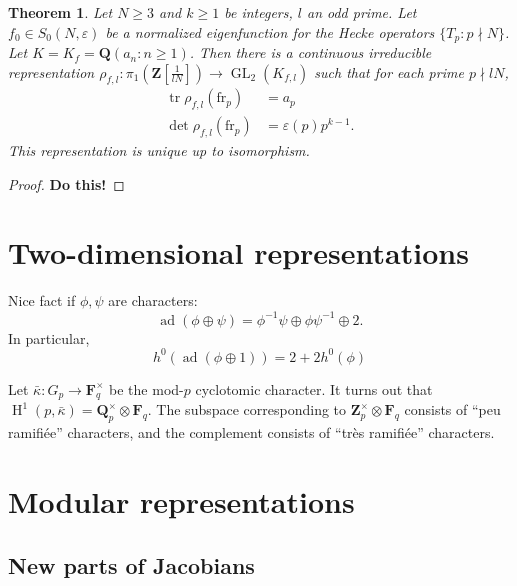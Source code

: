 \documentclass{article}
\DeclareMathOperator{\adjoint}{ad}
\DeclareMathOperator{\GL}{GL}
\DeclareMathOperator{\h}{H}
\DeclareMathOperator{\trace}{tr}
\newcommand{\dF}{\mathbf{F}}
\newcommand{\dQ}{\mathbf{Q}}
\newcommand{\dZ}{\mathbf{Z}}
\newcommand{\arithfrob}{\mathrm{fr}}
\newtheorem{theorem}[subsection]{Theorem}
\begin{document}
\begin{theorem}
Let $N\geqslant 3$ and $k\geqslant 1$ be integers, $l$ an odd prime. Let 
$f_0\in S_0(N,\varepsilon)$ be a normalized eigenfunction for the Hecke 
operators $\{T_p:p\nmid N\}$. Let $K=K_f=\dQ(a_n:n\geqslant 1)$. 
Then there is a continuous irreducible representation 
$\rho_{f,l}:\pi_1\left(\dZ[\frac{1}{l N}]\right)\to \GL_2(K_{f,l})$ such that 
for each prime $p\nmid l N$, 
\begin{align*}
  \trace \rho_{f,l}(\arithfrob_p) &= a_p \\
  \det \rho_{f,l}(\arithfrob_p) &= \varepsilon(p) p^{k-1} .
\end{align*}
This representation is unique up to isomorphism. 
\end{theorem}
\begin{proof}
\textbf{Do this!}
\end{proof}





\section{Two-dimensional representations}

Nice fact if $\phi,\psi$ are characters: 
\[
  \adjoint(\phi\oplus \psi) = \phi^{-1}\psi\oplus \phi\psi^{-1}\oplus 2 .
\]
In particular, 
\[
  h^0(\adjoint(\phi\oplus 1)) = 2+2 h^0(\phi)
\]

Let $\bar\kappa:G_p\to \dF_q^\times$ be the mod-$p$ cyclotomic character. It 
turns out that $\h^1(p,\bar\kappa)=\dQ_p^\times\otimes \dF_q$. The subspace 
corresponding to $\dZ_p^\times\otimes \dF_q$ consists of ``peu ramifi\'ee'' 
characters, and the complement consists of ``tr\`es ramifi\'ee'' characters. 





\section{Modular representations}


\subsection{New parts of Jacobians}
\end{document}
